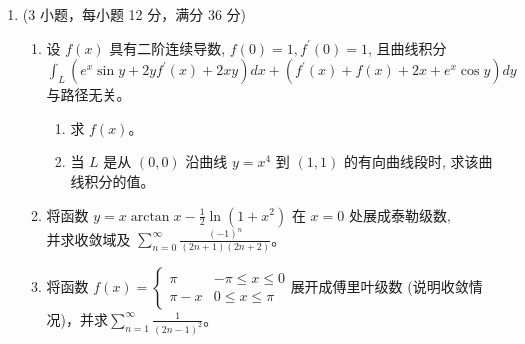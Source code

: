 \begin{enumerate}
{\begin{enumerate}
	\end{enumerate}
	
	
}


\item 
(3 小题，每小题 12 分，满分 36 分)
\begin{enumerate}
	\item
设 $f(x)$ 具有二阶连续导数, $f(0)=1, f^{\prime}(0)=1$, 且曲线积分 $\int_{L}\left(e^{x} \sin y+2 y f^{\prime}(x)+2 x y\right) d x+\left(f^{\prime}(x)+f(x)+2 x+e^{x} \cos y\right) d y$ 与路径无关。
\begin{enumerate}
	\item
	求 $f(x)$。
	\item 
	当 $L$ 是从 $(0,0)$ 沿曲线 $y=x^{4}$ 到 $(1,1)$ 的有向曲线段时, 求该曲线积分的值。
	
	
	
	
\end{enumerate}

\item 
将函数 $y=x \arctan x-\frac{1}{2} \ln \left(1+x^{2}\right)$ 在 $x=0$ 处展成泰勒级数,
\\并求收敛域及 $ \sum\limits_{n=0}^{\infty} \frac{(-1)^{n}}{(2 n+1)(2 n+2)} $。
	
\item 
将函数 $f(x)=\left\{\begin{array}{ll}\pi & -\pi \leqslant x \leqslant 0 \\ \pi-x & 0 \leqslant x \leqslant \pi\end{array}\right.$展开成傅里叶级数 (说明收敛情况)，并求$\sum\limits_{n=1}^{\infty} \frac{1}{(2 n-1)^{2}}$。


	
\end{enumerate}



\end{enumerate}
